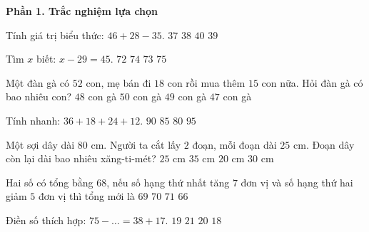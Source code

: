 \textbf{Phần 1. Trắc nghiệm lựa chọn}

\begin{ex} %
Tính giá trị biểu thức: $46 + 28 - 35$.
\choice
{$37$}
{$38$}
{$40$}
{\True $39$}
\end{ex}

\begin{ex} %
Tìm $x$ biết: $x - 29 = 45$.
\choice
{$72$}
{\True $74$}
{$73$}
{$75$}
\end{ex}

\begin{ex} %
Một đàn gà có $52$ con, mẹ bán đi $18$ con rồi mua thêm $15$ con nữa. Hỏi đàn gà có bao nhiêu con?
\choice
{$48$ con gà}
{$50$ con gà}
{\True $49$ con gà}
{$47$ con gà}
\end{ex}

\begin{ex} %
Tính nhanh: $36 + 18 + 24 + 12$.
\choice
{\True $90$}
{$85$}
{$80$}
{$95$}
\end{ex}

\begin{ex} %
Một sợi dây dài $80\text{ cm}$. Người ta cắt lấy $2$ đoạn, mỗi đoạn dài $25\text{ cm}$. Đoạn dây còn lại dài bao nhiêu xăng-ti-mét?
\choice
{$25\text{ cm}$}
{$35\text{ cm}$}
{$20\text{ cm}$}
{\True $30\text{ cm}$}
\end{ex}

\begin{ex} %
Hai số có tổng bằng $68$, nếu số hạng thứ nhất tăng $7$ đơn vị và số hạng thứ hai giảm $5$ đơn vị thì tổng mới là
\choice
{$69$}
{\True $70$}
{$71$}
{$66$}
\end{ex}

\begin{ex} %
Điền số thích hợp: $75 - \dots = 38 + 17$.
\choice
{$19$}
{$21$}
{\True $20$}
{$18$}
\end{ex}

